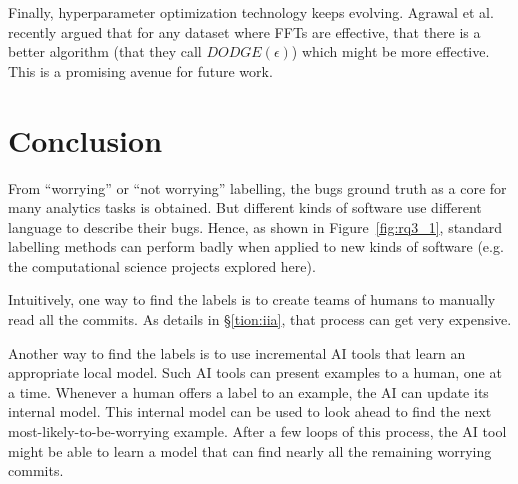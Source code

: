\documentclass[10pt,journal,compsoc]{IEEEtran}
\newcommand{\bi}{\begin{itemize}[leftmargin=0.4cm]}
\newcommand{\ei}{\end{itemize}}
\newcommand{\fig}[1]{Figure~\ref{fig:#1}}
\newcommand{\tion}[1]{\S\ref{tion:#1}}
\begin{document}
Finally,
hyperparameter optimization technology keeps evolving.
 Agrawal et al. \cite{agrawal2019dodge} recently argued
 that for any dataset where FFTs are effective, that there is a better
 algorithm (that they call 
 $DODGE(\epsilon)$) which might be more effective.
 This is a promising avenue for future work.
 



\section{Conclusion}



From ``worrying'' or ``not worrying'' labelling, the bugs ground truth as a core for many analytics tasks is obtained.  
But different kinds of software use 
different language to describe their bugs. Hence, as shown in \fig{rq3_1}, standard labelling methods can  perform   badly 
when applied to new kinds
of software (e.g. the computational science projects explored here).

Intuitively, one way to find the labels is to create teams of humans to manually read all the commits. As details in \tion{iia}, that process can get very expensive.

Another way to find the labels is to use incremental AI tools that learn an
appropriate local model. Such  AI tools can present
examples to a human,  one  at a time. Whenever a human
offers a label to an example, the AI can update its internal model.
This internal model can be used to look ahead to find the next most-likely-to-be-worrying example.
After  a few loops of this process, the AI tool might be able to learn a model
that can find nearly all the remaining worrying commits. 





\end{document}

